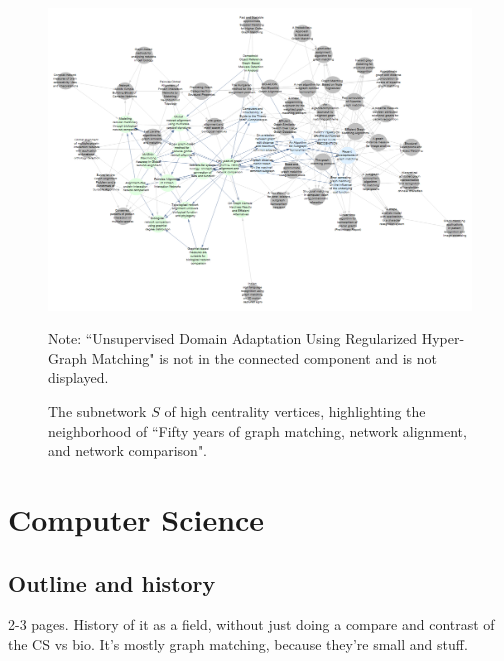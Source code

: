 \documentclass[12pt]{thesis}
\theoremstyle{plain}
\theoremstyle{definition}
\theoremstyle{remark}
\begin{document}
\begin{figure}[h]
\centering
\includegraphics[width=\textwidth]{reading_list_neighborhood0pt9crop.png}
\caption{The subnetwork $S$ of high centrality vertices, highlighting the neighborhood of ``Fifty years of graph matching, network alignment, and network comparison".}
\vspace{-12pt}\flushleft\scriptsize Note: ``Unsupervised Domain Adaptation Using Regularized Hyper-Graph Matching" is not in the connected component and is not displayed.
\label{fig:reading_list_neighborhood}
\end{figure}
















\chapter{Computer Science}
 







\section{Outline and history}

2-3 pages. History of it as a field, without just doing a compare and contrast of the CS vs bio. It's mostly graph matching, because they're small and stuff.
\end{document}

